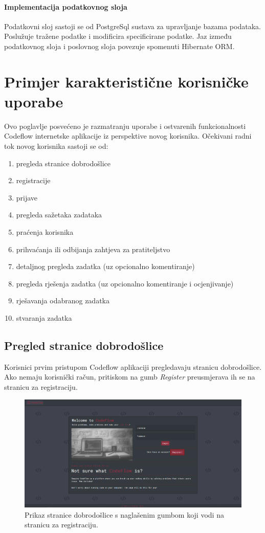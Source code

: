 \documentclass[times, utf8, zavrsni]{fer}
\begin{document}
			\subsubsection{Implementacija podatkovnog sloja}
			Podatkovni sloj sastoji se od PostgreSql sustava za upravljanje bazama podataka. Poslužuje tražene podatke i modificira specificirane podatke. Jaz između podatkovnog sloja i poslovnog sloja povezuje spomenuti Hibernate ORM.
			
	\chapter{Primjer karakteristične korisničke uporabe}
	Ovo poglavlje posvećeno je razmatranju uporabe i ostvarenih funkcionalnosti Codeflow internetske aplikacije iz perspektive novog korisnika. Očekivani radni tok novog korisnika sastoji se od:
	\begin{enumerate}
		\item pregleda stranice dobrodošlice
		\item registracije
		\item prijave
		\item pregleda sažetaka zadataka
		\item praćenja korisnika
		\item prihvaćanja ili odbijanja zahtjeva za pratiteljstvo
		\item detaljnog pregleda zadatka (uz opcionalno komentiranje)
		\item pregleda rješenja zadatka (uz opcionalno komentiranje i ocjenjivanje)
		\item rješavanja odabranog zadatka
		\item stvaranja zadatka
	\end{enumerate}

		\section{Pregled stranice dobrodošlice}
		Korisnici prvim pristupom Codeflow aplikaciji pregledavaju stranicu dobrodošlice. Ako nemaju korisnički račun, pritiskom na gumb \textit{Register} preusmjerava ih se na stranicu za registraciju.
		\begin{figure}[htb]
			\centering
			\includegraphics[width=\linewidth]{pictures/koristenje/StranicaDobrodoslice.png}
			\caption{Prikaz stranice dobrodošlice s naglašenim gumbom koji vodi na stranicu za registraciju.}
			\label{fig:welcome}
		\end{figure}
	
\end{document}
